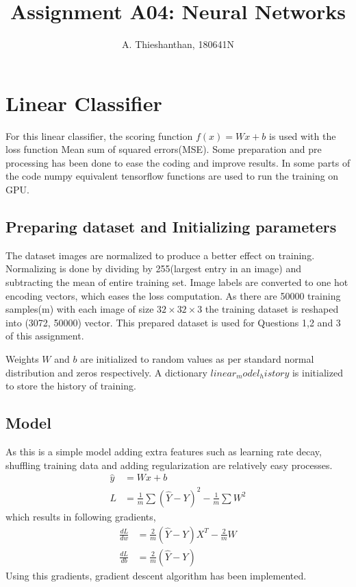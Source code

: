 \documentclass[a4paper, 12pt]{article}
\title{Assignment A04: Neural Networks}
\author{A. Thieshanthan, 180641N}
\begin{document}
	
	\maketitle
	
	\begin{abstract}
		
	\end{abstract}

	\section{Linear Classifier}
		For this linear classifier, the scoring function $f(x)=Wx+b$ is used with the loss function Mean sum of squared errors(MSE). Some preparation and pre processing has been done to ease the coding and improve results. In some parts of the code numpy equivalent tensorflow functions are used to run the training on GPU.
		\subsection{Preparing dataset and Initializing parameters}
			The dataset images are normalized to produce a better effect on training. Normalizing is done by dividing by 255(largest entry in an image) and subtracting the mean of entire training set. Image labels are converted to one hot encoding vectors, which eases the loss computation. As there are 50000 training samples(m) with each image of size $32 \times 32\times 3$ the training dataset is reshaped into (3072, 50000) vector. This prepared dataset is used for Questions 1,2 and 3 of this assignment.
			\par 
			Weights $W$ and $b$ are initialized to random values as per standard normal distribution and zeros respectively. A dictionary $linear_model_history$ is initialized to store the history of training.
		\subsection{Model}
			As this is a simple model adding extra features such as learning rate decay, shuffling training data and adding regularization are relatively easy processes. 
			\begin{align}
					\hat{y} & = Wx + b \\
					L &= \frac{1}{m}\sum{(\hat{Y}-Y)^2} - \frac{1}{m}\sum W^2
			\end{align}
			which results in following gradients,
			\begin{align*}
				\frac{dL}{dw} &= \frac{2}{m}(\hat{Y} - Y)X^T - \frac{2}{m}W\\
				\frac{dL}{db} &= \frac{2}{m}(\hat{Y} - Y)
			\end{align*}
		Using this gradients, gradient descent algorithm has been implemented.
\end{document}
